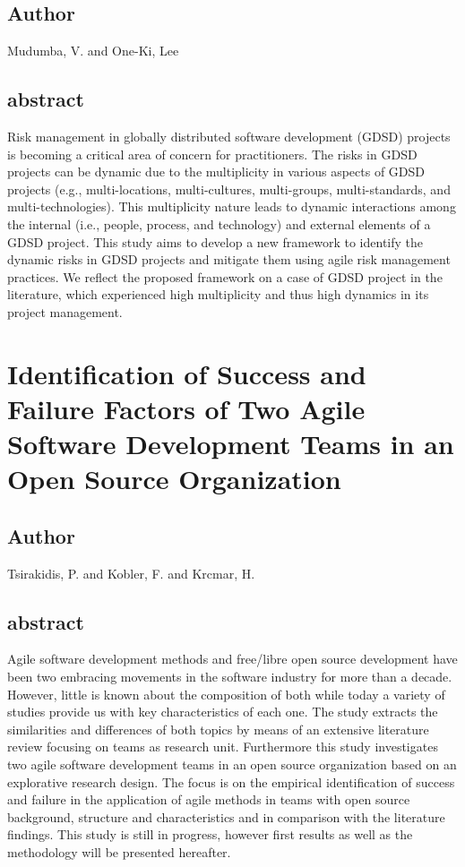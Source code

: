\documentclass[lnbip,sechang,a4paper]{svmultln}
\begin{document}
\subsection{Author}
Mudumba, V. and One-Ki, Lee
\subsection{abstract}
Risk management in globally distributed software development (GDSD) projects is
becoming a critical area of concern for practitioners. The risks in GDSD
projects can be dynamic due to the multiplicity in various aspects of GDSD projects (e.g., multi-locations, multi-cultures, multi-groups, multi-standards, and multi-technologies). This multiplicity nature leads to dynamic interactions among the internal (i.e., people, process, and technology) and external elements of a GDSD project. This study aims to develop a new framework to identify the dynamic risks in GDSD projects and mitigate them using agile risk management practices. We reflect the proposed framework on a case of GDSD project in the literature, which experienced high multiplicity and thus high dynamics in its project management.
\cite{5581512}
\section{Identification of Success and Failure Factors of Two Agile Software
Development Teams in an Open Source Organization}
\subsection{Author}
Tsirakidis, P. and Kobler, F. and Krcmar, H.
\subsection{abstract}
Agile software development methods and free/libre open source development have
been two embracing movements in the software industry for more than a decade.
However, little is known about the composition of both while today a variety of studies provide us with key characteristics of each one. The study extracts the similarities and differences of both topics by means of an extensive literature review focusing on teams as research unit. Furthermore this study investigates two agile software development teams in an open source organization based on an explorative research design. The focus is on the empirical identification of success and failure in the application of agile methods in teams with open source background, structure and characteristics and in comparison with the literature findings. This study is still in progress, however first results as well as the methodology will be presented hereafter.
\cite{5196948}
\end{document}
